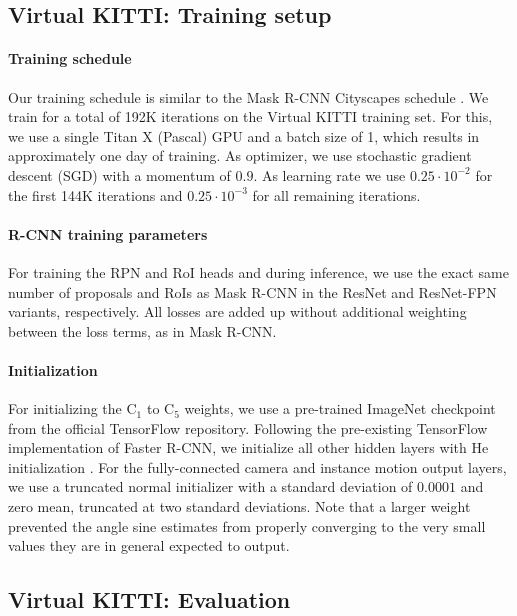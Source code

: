 \subsection{Virtual KITTI: Training setup}
\label{ssec:setup}

\paragraph{Training schedule}
Our training schedule is similar to the Mask R-CNN Cityscapes schedule \cite{MaskRCNN}.
We train for a total of 192K iterations on the Virtual KITTI training set.
For this, we use a single Titan X (Pascal) GPU and a batch size of 1,
which results in approximately one day of training.
As optimizer, we use stochastic gradient descent (SGD) \cite{SGD} with a
momentum of $0.9$.
As learning rate we use $0.25 \cdot 10^{-2}$ for the
first 144K iterations and $0.25 \cdot 10^{-3}$ for all remaining iterations.

\paragraph{R-CNN training parameters}
For training the RPN and RoI heads and during inference,
we use the exact same number of proposals and RoIs as Mask R-CNN in
the ResNet and ResNet-FPN variants, respectively.
All losses are added up without additional weighting between the loss terms,
as in Mask R-CNN.

\paragraph{Initialization}
For initializing the  C$_1$ to C$_5$ weights, we use a pre-trained
ImageNet \cite{ImageNet} checkpoint from the official TensorFlow repository.
Following the pre-existing TensorFlow implementation of Faster R-CNN,
we initialize all other hidden layers with He initialization \cite{He}.
For the fully-connected camera and instance motion output layers,
we use a truncated normal initializer with a standard
deviation of $0.0001$ and zero mean, truncated at two standard deviations.
Note that a larger weight prevented the
angle sine estimates from properly converging to the very small values they
are in general expected to output.

\subsection{Virtual KITTI: Evaluation}
\label{ssec:vkitti}

